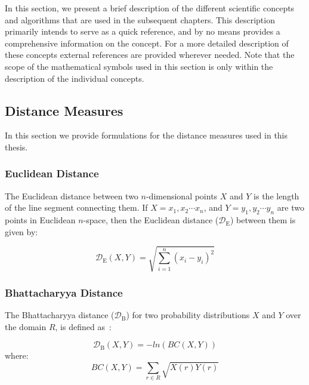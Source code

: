 In this section, we present a brief description of the different scientific concepts and algorithms that are used in the subsequent chapters. This description primarily intends to serve as a quick reference, and by no means provides a comprehensive information on the concept. For a more detailed description of these concepts external references are provided wherever needed. Note that the scope of the mathematical symbols used in this section is only within the description of the individual concepts. 

\subsection{Distance Measures}
\label{sec:distance_measures}

In this section we provide formulations for the distance measures used in this thesis. 

\subsubsection{Euclidean Distance}
\label{sec:euclidean_distance}

The Euclidean distance between two $n$-dimensional points $X$ and $Y$ is the length of the line segment connecting them. If $X=x_1, x_2\cdots x_n$, and $Y=y_1, y_2\cdots y_n$ are two points in Euclidean $n$-space, then the Euclidean distance ($\mathcal{D}_\mathrm{E}$) between them is given by:

\begin{equation}
\label{eq:euclidean_distance}
	\mathcal{D}_\mathrm{E}(X,Y) = \sqrt{\sum_{i=1}^{n}(x_i-y_i)^2}	
\end{equation}

\subsubsection{Bhattacharyya Distance}
\label{sec:bhattacharya_distance}

The Bhattacharyya distance  ($\mathcal{D}_\mathrm{B}$) for two probability distributions $X$ and $Y$ over the domain $R$,  is defined as~\citep{bhattacharyya1946measure}:

\begin{equation}
\label{eq:bhattacharya_distance}
\mathcal{D}_\mathrm{B}(X,Y) = -ln(BC(X,Y)) 
\end{equation}
where:
\begin{equation}
BC(X,Y) = \sum_{r \in R} \sqrt{X(r)Y(r)}
\end{equation}


